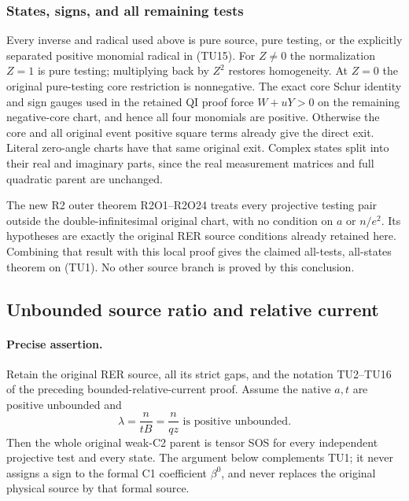 \subsubsection*{States, signs, and all remaining tests}

Every inverse and radical used above is pure source, pure testing,
or the explicitly separated positive monomial radical in (TU15).
For $Z\ne0$ the normalization $Z=1$ is pure testing; multiplying
back by $Z^2$ restores homogeneity.  At $Z=0$ the original
pure-testing core restriction is nonnegative.  The exact core
Schur identity and sign gauges used in the retained QI proof
force $W+uY>0$ on the remaining negative-core chart, and hence
all four monomials are positive.  Otherwise the core and all
original event positive square terms already give the direct exit.  Literal
zero-angle charts have that same original exit.  Complex states
split into their real and imaginary parts, since the real
measurement matrices and full quadratic parent are unchanged.

The new R2 outer theorem R2O1--R2O24 treats every projective
testing pair outside the double-infinitesimal original chart,
with no condition on $a$ or $n/e^2$.  Its hypotheses are exactly
the original RER source conditions already retained here.
Combining that result with this local proof gives the claimed
all-tests, all-states theorem on (TU1).  No other source branch
is proved by this conclusion.

\subsection{Unbounded source ratio and relative current}
\label{component:pef021eabacde}

\label{pef021eabacde:sec:r2-unbounded-current-new}

\paragraph{Precise assertion.}
Retain the original RER source, all its strict gaps, and the notation
TU2--TU16 of the preceding bounded-relative-current proof.
Assume the native $a,t$ are positive unbounded and
\[
             \lambda=\frac{n}{tB}=\frac{n}{qz}
                   \text{ is positive unbounded}.                 \tag{UL1}
\]
Then the whole original weak-C2 parent is tensor SOS for every
independent projective test and every state. The argument below
complements TU1; it never assigns a sign to the formal C1 coefficient
$\beta^0$, and never replaces the original physical source by that
formal source.

